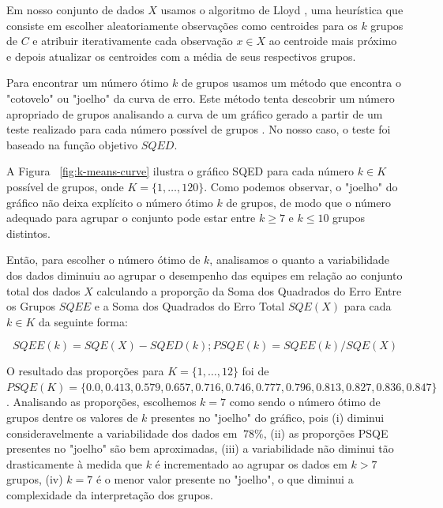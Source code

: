 Em nosso conjunto de dados $X$ usamos o algoritmo de Lloyd \cite{ong2015player}, uma heurística que consiste em escolher aleatoriamente observações como centroides para os $k$ grupos de $C$ e atribuir iterativamente cada observação $x \in X$ ao centroide mais próximo e depois atualizar os centroides com a média de seus respectivos grupos.

Para encontrar um número ótimo $k$ de grupos usamos um método que encontra o "cotovelo" ou "joelho" da curva de erro. Este método tenta descobrir um número apropriado de grupos analisando a curva de um gráfico gerado a partir de um teste realizado para cada número possível de grupos \cite{kodinariya2013review}. No nosso caso, o teste foi baseado na função objetivo $SQED$.


A Figura ~\ref{fig:k-means-curve} ilustra o gráfico SQED para cada número $k \in K$ possível de grupos, onde $K = \{1, \ldots, 120\}$. Como podemos observar, o "joelho" do gráfico não deixa explícito o número ótimo $k$ de grupos, de modo que o número adequado para agrupar o conjunto pode estar entre $k \geq 7$ e $k \leq 10$ grupos distintos.

Então, para escolher o número ótimo de $k$, analisamos o quanto a variabilidade dos dados diminuiu ao agrupar o desempenho das equipes em relação ao conjunto total dos dados $X$ calculando a proporção da Soma dos Quadrados do Erro Entre os Grupos $SQEE$ e a Soma dos Quadrados do Erro Total $SQE(X)$ para cada $k \in K$ da seguinte forma:

\begin{displaymath}
  SQEE(k) = SQE(X) - SQED(k); PSQE(k) = SQEE(k)/SQE(X)
\end{displaymath}

O resultado das proporções para $K=\{1, \ldots, 12\}$ foi de $PSQE(K) = \{0.0, 0.413, 0.579, 0.657, 0.716, 0.746, 0.777, 0.796, 0.813, 0.827, 0.836, 0.847\}$. Analisando as proporções, escolhemos $k=7$ como sendo o número ótimo de grupos dentre os valores de $k$ presentes no "joelho" do gráfico, pois (i) diminui consideravelmente a variabilidade dos dados em $~78\%$, (ii) as proporções PSQE presentes no "joelho" são bem aproximadas, (iii) a variabilidade não diminui tão drasticamente à medida que $k$ é incrementado ao agrupar os dados em $k > 7$ grupos, (iv) $k=7$ é o menor valor presente no "joelho", o que diminui a complexidade da interpretação dos grupos.

